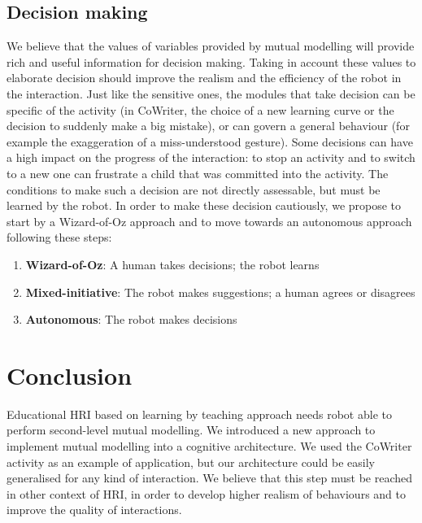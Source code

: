 \documentclass[conference]{IEEEtran}
\begin{document}
\subsection{Decision making}
\label{ssec:decision}
We believe that the values of variables provided by mutual modelling will provide rich and useful information for decision making. Taking in account these values to elaborate decision should improve the realism and the efficiency of the robot in the interaction.
Just like the sensitive ones, the modules that take decision can be specific of the activity (in CoWriter, the choice of a new learning curve or the decision to suddenly make a big mistake), or can govern a general behaviour (for example the exaggeration of a miss-understood gesture). Some decisions can have a high impact on the progress of the interaction: to stop an activity and to switch to a new one can frustrate a child that was committed into the activity. The conditions to make such a decision are not directly assessable, but must be learned by the robot. In order to make these decision cautiously, we propose to start by a Wizard-of-Oz approach and to move towards an autonomous approach following these steps: 
\begin{enumerate}
\item \textbf{Wizard-of-Oz}: A human takes decisions; the robot learns
\item \textbf{Mixed-initiative}: The robot makes suggestions; a human agrees or disagrees
\item \textbf{Autonomous}: The robot makes decisions
\end{enumerate}



\section{Conclusion}

Educational HRI based on learning by teaching approach needs robot able to perform second-level mutual modelling. 
We introduced a new approach to implement mutual modelling into a cognitive architecture. We used the CoWriter activity
as an example of application, but our architecture could be easily generalised for any kind of interaction.
We believe that this step must be reached in other context of HRI, in order to develop higher realism of behaviours
and to improve the quality of interactions. 
\end{document}
